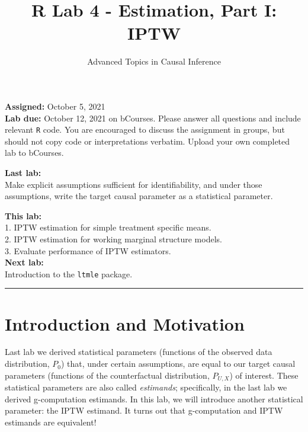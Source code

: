 \documentclass[answers]{exam}
\title{R Lab 4 - Estimation, Part I: IPTW}
\author{Advanced Topics in Causal Inference}
\date{}
\begin{document}
\maketitle



\noindent \textbf{Assigned:} October 5, 2021\\
\textbf{Lab due:} October 12, 2021 on bCourses. Please answer all questions and include relevant \texttt{R} code. You are encouraged to discuss the assignment in groups, but should not copy code or interpretations verbatim. Upload your own completed lab to bCourses.

\noindent \textbf{Last lab:} \\
Make explicit assumptions sufficient for identifiability, and under those assumptions, write the target causal parameter as a statistical parameter.


\noindent \textbf{This lab:}\\
1. IPTW estimation for simple treatment specific means. \\
2. IPTW estimation for working marginal structure models. \\
3. Evaluate performance of IPTW estimators. \\

\noindent \textbf{Next lab:}\\
Introduction to the \texttt{ltmle} package.



\begin{center}
\noindent\rule{18cm}{0.4pt}
\end{center}


\section{Introduction and Motivation}

Last lab we derived statistical parameters (functions of the observed data distribution, $P_0$) that, under certain assumptions, are equal to our target causal parameters (functions of the counterfactual distribution, $P_{U,X}$) of interest. These statistical parameters are also called \textit{estimands}; specifically, in the last lab we derived g-computation estimands. In this lab, we will introduce another statistical parameter: the IPTW estimand. It turns out that g-computation and IPTW estimands are equivalent! %
\end{document}
